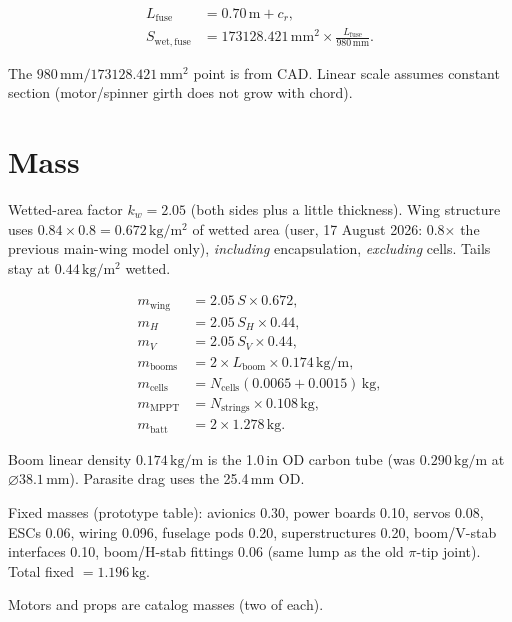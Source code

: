 \documentclass[11pt,letterpaper]{article}
\begin{document}
\begin{align}
  L_\mathrm{fuse} &= 0.70\,\mathrm{m} + c_r, \\
  S_{\mathrm{wet,fuse}} &= 173128.421\,\mathrm{mm}^2 \times \frac{L_\mathrm{fuse}}{980\,\mathrm{mm}}.
\end{align}

The $980\,\mathrm{mm} / 173128.421\,\mathrm{mm}^2$ point is from CAD. Linear scale assumes constant section (motor/spinner girth does not grow with chord).

\section{Mass}

Wetted-area factor $k_w = 2.05$ (both sides plus a little thickness). Wing structure uses $0.84\times 0.8 = 0.672\,\mathrm{kg/m^2}$ of wetted area (user, 17 August 2026: 0.8$\times$ the previous main-wing model only), \emph{including} encapsulation, \emph{excluding} cells. Tails stay at $0.44\,\mathrm{kg/m^2}$ wetted.

\begin{align}
  m_\mathrm{wing}  &= 2.05\, S \times 0.672, \\
  m_{H}            &= 2.05\, S_H \times 0.44, \\
  m_{V}            &= 2.05\, S_V \times 0.44, \\
  m_\mathrm{booms} &= 2 \times L_\mathrm{boom} \times 0.174\,\mathrm{kg/m}, \\
  m_\mathrm{cells} &= N_\mathrm{cells} (0.0065 + 0.0015)\,\mathrm{kg}, \\
  m_\mathrm{MPPT}  &= N_\mathrm{strings} \times 0.108\,\mathrm{kg}, \\
  m_\mathrm{batt}  &= 2 \times 1.278\,\mathrm{kg}.
\end{align}

Boom linear density $0.174\,\mathrm{kg/m}$ is the 1.0\,in OD carbon tube (was $0.290\,\mathrm{kg/m}$ at $\varnothing 38.1\,\mathrm{mm}$). Parasite drag uses the 25.4\,mm OD.

Fixed masses (prototype table): avionics 0.30, power boards 0.10, servos 0.08, ESCs 0.06, wiring 0.096, fuselage pods 0.20, superstructures 0.20, boom/V-stab interfaces 0.10, boom/H-stab fittings 0.06 (same lump as the old $\pi$-tip joint). Total fixed $= 1.196\,\mathrm{kg}$.

Motors and props are catalog masses (two of each).
\end{document}
